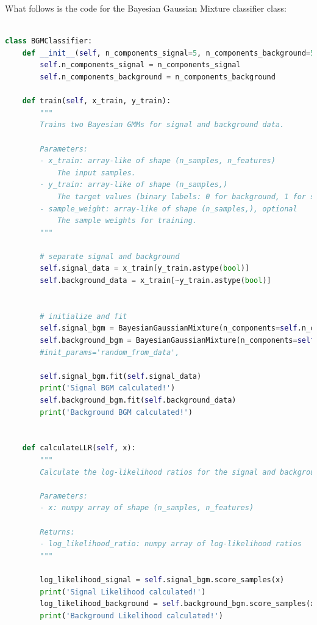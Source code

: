What follows is the code for the Bayesian Gaussian Mixture classifier class:

\begin{lstlisting}[language=Python]

class BGMClassifier:
    def __init__(self, n_components_signal=5, n_components_background=5):
        self.n_components_signal = n_components_signal
        self.n_components_background = n_components_background
    
    def train(self, x_train, y_train):
        """
        Trains two Bayesian GMMs for signal and background data.

        Parameters:
        - x_train: array-like of shape (n_samples, n_features)
            The input samples.
        - y_train: array-like of shape (n_samples,)
            The target values (binary labels: 0 for background, 1 for signal).
        - sample_weight: array-like of shape (n_samples,), optional
            The sample weights for training.
        """
        
        # separate signal and background
        self.signal_data = x_train[y_train.astype(bool)]
        self.background_data = x_train[~y_train.astype(bool)]
        

        # initialize and fit
        self.signal_bgm = BayesianGaussianMixture(n_components=self.n_components_signal, n_init=5, init_params='k-means++', random_state=None, max_iter=1000, tol=5e-4, warm_start=True)
        self.background_bgm = BayesianGaussianMixture(n_components=self.n_components_background, n_init=5, init_params='k-means++', random_state=None, max_iter=1000, tol=5e-4, warm_start=True)
        #init_params='random_from_data', 
        
        self.signal_bgm.fit(self.signal_data)
        print('Signal BGM calculated!')
        self.background_bgm.fit(self.background_data)
        print('Background BGM calculated!')

    
    def calculateLLR(self, x):
        """
        Calculate the log-likelihood ratios for the signal and background hypotheses.

        Parameters:
        - x: numpy array of shape (n_samples, n_features)

        Returns:
        - log_likelihood_ratio: numpy array of log-likelihood ratios
        """
        
        log_likelihood_signal = self.signal_bgm.score_samples(x)
        print('Signal Likelihood calculated!')
        log_likelihood_background = self.background_bgm.score_samples(x)
        print('Background Likelihood calculated!')


\end{lstlisting}

